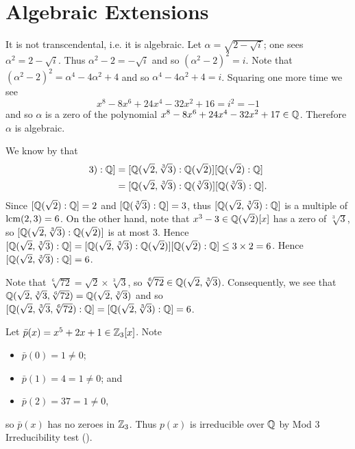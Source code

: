 \section{Algebraic Extensions}
\begin{questions}
    \item It is not transcendental, i.e. it is algebraic. Let $\alpha = \sqrt{2-\sqrt{i}}$; one sees $\alpha^2 = 2 - \sqrt{i}$. Thus $\alpha^2 - 2 = -\sqrt{i}$ and so $(\alpha^2-2)^2 = i$. Note that $(\alpha^2 - 2)^2 = \alpha^4 - 4\alpha^2 + 4$ and so $\alpha^4 - 4\alpha^2 + 4 = i$. Squaring one more time we see
    \[
        x^8 - 8x^6 + 24x^4 - 32x^2 + 16 = i^2 = -1
    \]
    and so $\alpha$ is a zero of the polynomial $x^8 - 8x^6 + 24x^4 - 32x^2 + 17 \in \mathbb{Q}$. Therefore $\alpha$ is algebraic.

    \item \begin{partquestions}{\alph*}
        \item \begin{partquestions}{\roman*}
            \item We know by  that
            \begin{align*}
                [\Q(\sqrt2, \sqrt[3]3): \Q] &= [\Q(\sqrt2, \sqrt[3]3): \Q(\sqrt2)][\Q(\sqrt2):\Q]\\
                &= [\Q(\sqrt2, \sqrt[3]3): \Q(\sqrt[3]3)][\Q(\sqrt[3]3):\Q].
            \end{align*}
            Since $[\mathbb{Q}(\sqrt2):\mathbb{Q}] = 2$ and $[\mathbb{Q}(\sqrt[3]3):\mathbb{Q}] = 3$, thus $[\mathbb{Q}(\sqrt2, \sqrt[3]3): \mathbb{Q}]$ is a multiple of $\mathrm{lcm}(2, 3) = 6$. On the other hand, note that $x^3 - 3 \in \mathbb{Q}(\sqrt2)[x]$ has a zero of $\sqrt[3]3$, so $[\mathbb{Q}(\sqrt2, \sqrt[3]3): \mathbb{Q}(\sqrt2)]$ is at most 3. Hence $[\mathbb{Q}(\sqrt2, \sqrt[3]3): \mathbb{Q}] = [\mathbb{Q}(\sqrt2, \sqrt[3]3): \mathbb{Q}(\sqrt2)][\mathbb{Q}(\sqrt2):\mathbb{Q}] \leq 3 \times 2 = 6$. Hence $[\mathbb{Q}(\sqrt2, \sqrt[3]3): \mathbb{Q}] = 6$.
            
            \item Note that $\sqrt[6]{72} = \sqrt2 \times \sqrt[3]3$, so $\sqrt[6]{72} \in \mathbb{Q}(\sqrt2, \sqrt[3]3)$. Consequently, we see that $\mathbb{Q}(\sqrt2, \sqrt[3]3, \sqrt[6]{72}) = \mathbb{Q}(\sqrt2, \sqrt[3]3)$ and so $[\mathbb{Q}(\sqrt2, \sqrt[3]3, \sqrt[6]{72}):\mathbb{Q}] = [\mathbb{Q}(\sqrt2, \sqrt[3]3): \mathbb{Q}] = 6$.
        \end{partquestions}
        
        \item \begin{partquestions}{\roman*}
            \item Let $\bar{p}(x) = x^5 + 2x + 1 \in \mathbb{Z}_3[x]$. Note
            \begin{itemize}
                \item $\bar{p}(0) = 1 \neq 0$;
                \item $\bar{p}(1) = 4 = 1 \neq 0$; and
                \item $\bar{p}(2) = 37 = 1 \neq 0$,
            \end{itemize}
            so $\bar{p}(x)$ has no zeroes in $\mathbb{Z}_3$. Thus $p(x)$ is irreducible over $\mathbb{Q}$ by Mod 3 Irreducibility test ().
            

\end{partquestions}
\end{partquestions}
\end{questions}
